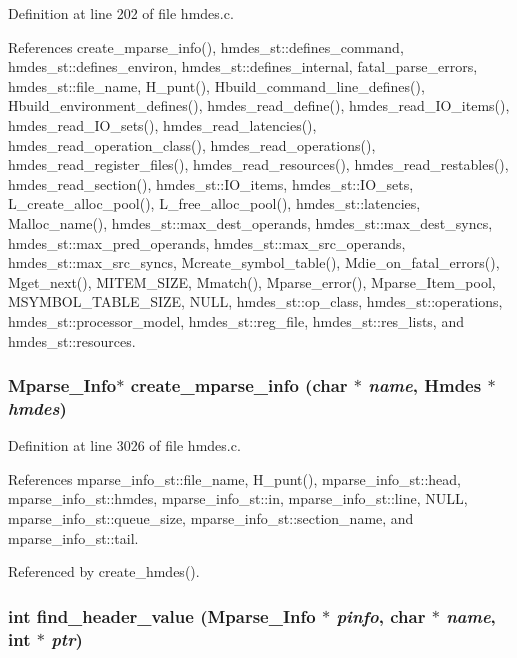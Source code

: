 Definition at line 202 of file hmdes.c.

References create\_\-mparse\_\-info(), hmdes\_\-st::defines\_\-command, hmdes\_\-st::defines\_\-environ, hmdes\_\-st::defines\_\-internal, fatal\_\-parse\_\-errors, hmdes\_\-st::file\_\-name, H\_\-punt(), Hbuild\_\-command\_\-line\_\-defines(), Hbuild\_\-environment\_\-defines(), hmdes\_\-read\_\-define(), hmdes\_\-read\_\-IO\_\-items(), hmdes\_\-read\_\-IO\_\-sets(), hmdes\_\-read\_\-latencies(), hmdes\_\-read\_\-operation\_\-class(), hmdes\_\-read\_\-operations(), hmdes\_\-read\_\-register\_\-files(), hmdes\_\-read\_\-resources(), hmdes\_\-read\_\-restables(), hmdes\_\-read\_\-section(), hmdes\_\-st::IO\_\-items, hmdes\_\-st::IO\_\-sets, L\_\-create\_\-alloc\_\-pool(), L\_\-free\_\-alloc\_\-pool(), hmdes\_\-st::latencies, Malloc\_\-name(), hmdes\_\-st::max\_\-dest\_\-operands, hmdes\_\-st::max\_\-dest\_\-syncs, hmdes\_\-st::max\_\-pred\_\-operands, hmdes\_\-st::max\_\-src\_\-operands, hmdes\_\-st::max\_\-src\_\-syncs, Mcreate\_\-symbol\_\-table(), Mdie\_\-on\_\-fatal\_\-errors(), Mget\_\-next(), MITEM\_\-SIZE, Mmatch(), Mparse\_\-error(), Mparse\_\-Item\_\-pool, MSYMBOL\_\-TABLE\_\-SIZE, NULL, hmdes\_\-st::op\_\-class, hmdes\_\-st::operations, hmdes\_\-st::processor\_\-model, hmdes\_\-st::reg\_\-file, hmdes\_\-st::res\_\-lists, and hmdes\_\-st::resources.
\subsubsection{\setlength{\rightskip}{0pt plus 5cm}\bf{Mparse\_\-Info}$\ast$ create\_\-mparse\_\-info (char $\ast$ {\em name}, \bf{Hmdes} $\ast$ {\em hmdes})}\label{hmdes_8h_adacad712867b0c7c17e6329ee3a0d98}




Definition at line 3026 of file hmdes.c.

References mparse\_\-info\_\-st::file\_\-name, H\_\-punt(), mparse\_\-info\_\-st::head, mparse\_\-info\_\-st::hmdes, mparse\_\-info\_\-st::in, mparse\_\-info\_\-st::line, NULL, mparse\_\-info\_\-st::queue\_\-size, mparse\_\-info\_\-st::section\_\-name, and mparse\_\-info\_\-st::tail.

Referenced by create\_\-hmdes().
\subsubsection{\setlength{\rightskip}{0pt plus 5cm}int find\_\-header\_\-value (\bf{Mparse\_\-Info} $\ast$ {\em pinfo}, char $\ast$ {\em name}, int $\ast$ {\em ptr})}\label{hmdes_8h_c172781c19adf04abeb09bc1d5769470}




